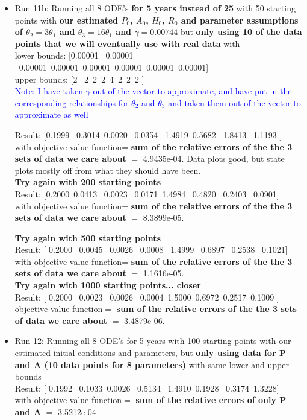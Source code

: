 \documentclass[12pt]{article}
\begin{document}
\begin{itemize}
\item Run 11b: Running all 8 ODE's \textbf{for 5 years instead of 25} with 50 starting points with \textbf{our estimated $P_0$, $A_0$, $H_0$, $R_0$ and parameter assumptions of $\theta_2=3 \theta_1$ and $\theta_3=16\theta_1$ and $\gamma=0.00744$} but  \textbf{only using 10 of the data points that we will eventually use with real data} with \\
lower bounds: [0.00001  \ 0.00001 \ 0.00001\ 0.00001\ 0.00001\ 0.00001\ 0.00001\ 0.00001] \\
upper bounds: [2 \ 2\  2\  2\  4\  2\  2\   2 ] \\
\textcolor{blue}{Note: I have taken $\gamma$ out of the vector to approximate, and have put in the corresponding relationships for $\theta_2$ and $\theta_3$ and taken them out of the vector to approximate as well} 

Result: [0.1999 \   0.3014\    0.0020 \   0.0354   \ 1.4919\    0.5682  \  1.8413 \   1.1193
 ] \\
with objective value function= \textbf{sum of the relative errors of the the 3 sets of data we care about} $=$ 4.9435e-04. Data plots good, but state plots mostly off from what they should have been. \\

 \textbf{Try again with 200 starting points} \\
Result: [0.2000\    0.0413  \  0.0023   \ 0.0171\    1.4984 \   0.4820 \   0.2403  \  0.0901] \\
with objective value function= \textbf{sum of the relative errors of the the 3 sets of data we care about} $=$    8.3899e-05.

 \textbf{Try again with 500 starting points} \\
Result: [ 0.2000  \  0.0045  \  0.0026  \  0.0008  \  1.4999 \   0.6897 \   0.2538  \  0.1021] \\
with objective value function= \textbf{sum of the relative errors of the the 3 sets of data we care about} $=$    1.1616e-05. \\

\textbf{Try again with 1000 starting points... closer} \\
Result: [   0.2000   \ 0.0023 \   0.0026 \   0.0004\    1.5000\    0.6972\    0.2517\    0.1009 ] \\
 objective value function$=$ \textbf{sum of the relative errors of the the 3 sets of data we care about} $=$ 3.4879e-06.


\item Run 12: Running all 8 ODE's for 5 years with 100 starting points with our estimated initial conditions and parameters, but \textbf{only using data for P and A (10 data points for 8 parameters)} with same lower and upper bounds \\
Result: [  0.1992   \ 0.1033\    0.0026  \  0.5134 \   1.4910\    0.1928   \ 0.3174\    1.3228] \\
with objective value function$=$ \textbf{sum of the relative errors of only P and A} $=$  3.5212e-04



\end{itemize}
\end{document}
